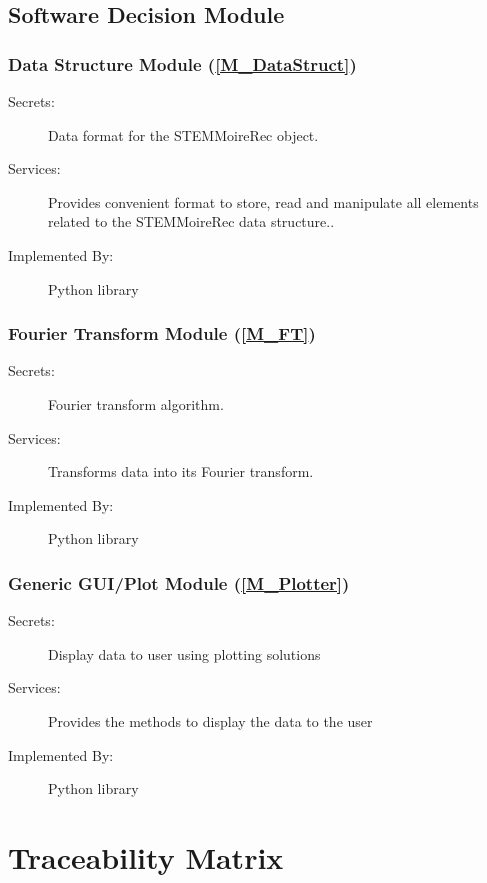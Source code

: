 \documentclass[12pt, titlepage]{article}
\newcommand{\progname}{STEMMoireRec}
\begin{document}
\subsection{Software Decision Module}

\subsubsection{Data Structure Module (\texorpdfstring{\cref{M_DataStruct}}))}
\label{MG_DataStruct}
\begin{description}
\item[Secrets:] Data format for the \progname{} object.
\item[Services:] Provides convenient format to store, read and manipulate all 
elements related to the \progname{} data structure..
\item[Implemented By:] Python library
\end{description}

\subsubsection{Fourier Transform Module (\texorpdfstring{\cref{M_FT}}))}
\label{MG_FT}
\begin{description}
\item[Secrets:] Fourier transform algorithm.
\item[Services:] Transforms data into its Fourier transform.
\item[Implemented By:]Python library
\end{description}


\subsubsection{Generic GUI/Plot Module (\texorpdfstring{\cref{M_Plotter}}))}
\label{MG_Plotter}
\begin{description}
\item[Secrets:] Display data to user using plotting solutions
\item[Services:] Provides the methods to display the data to the user
\item[Implemented By:] Python library
\end{description}

\section{Traceability Matrix} \label{SecTM}
\end{document}
